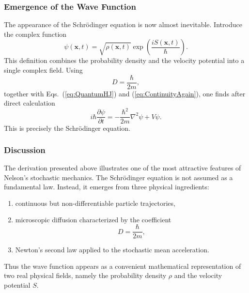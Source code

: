 \subsubsection*{Emergence of the Wave Function}
The appearance of the Schrödinger equation is now almost inevitable.
Introduce the complex function
\begin{equation}
\boxed{\psi(\mathbf x,t)=\sqrt{\rho(\mathbf x,t)}
    \exp\left(\frac{iS(\mathbf x,t)}{\hbar}\right).}
\label{eq:WaveFunction}
\end{equation}
This definition combines the probability density and the velocity
potential into a single complex field.
Using
\[D=\frac{\hbar}{2m},\]
together with
Eqs.~(\ref{eq:QuantumHJ})
and
(\ref{eq:ContinuityAgain}),
one finds after direct calculation
\begin{equation}
\boxed{i\hbar\frac{\partial\psi}{\partial t}=-\frac{\hbar^2}{2m}\nabla^2\psi+V\psi.}
\label{eq:Schrodinger}
\end{equation}
This is precisely the Schrödinger equation.
\subsubsection*{Discussion}
The derivation presented above illustrates one of the most attractive
features of Nelson's stochastic mechanics.
The Schrödinger equation is not assumed as a fundamental law.
Instead, it emerges from three physical ingredients:
\begin{enumerate}
\item
continuous but non-differentiable particle trajectories,
\item
microscopic diffusion characterized by the coefficient
\[D=\frac{\hbar}{2m},\]
\item
Newton's second law applied to the stochastic mean acceleration.
\end{enumerate}
Thus the wave function appears as a convenient mathematical
representation of two real physical fields, namely the probability
density $\rho$ and the velocity potential $S$.
